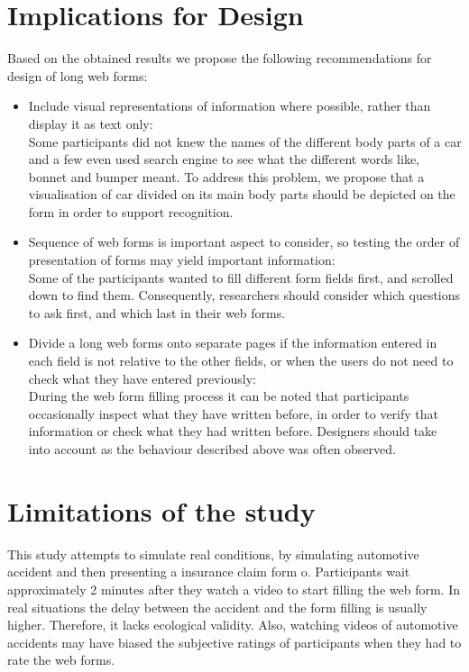 \documentclass[a4paper]{report}
\begin{document}
	\section{Implications for Design}
		Based on the obtained results we propose the following recommendations for design of long web forms:
		\begin{itemize}
			\item Include visual representations of information where possible, rather than display it as text only:\\
			Some participants did not knew the names of the different body parts of a car and a few even used search engine to see what the different words like, bonnet and bumper meant. To address this problem, we propose that a visualisation of car divided on its main body parts should be depicted on the form in order to support recognition.
			
			\item Sequence of web forms is important aspect to consider, so testing the order of presentation of forms may yield important information:\\
			Some of the participants wanted to fill different form fields first, and scrolled down to find them. Consequently, researchers should consider which questions to ask first, and which last in their web forms.
			
			\item Divide a long web forms onto separate pages if the information entered in each field is not relative to the other fields, or when the users do not need to check what they have entered previously:\\
			During the web form filling process it can be noted that participants occasionally inspect what they have written before, in order to verify that information or check what they had written before. Designers should take into account as the behaviour described above was often observed.
		\end{itemize}
		
	\section{Limitations of the study}
		This study attempts to simulate real conditions, by simulating automotive accident and then presenting a insurance claim form o. Participants wait approximately 2 minutes after they watch a video to start filling the web form. In real situations the delay between the accident and the form filling is usually higher. Therefore, it lacks ecological validity. Also, watching videos of automotive accidents may have biased the subjective ratings of participants when they had to rate the web forms.
		
\end{document}
